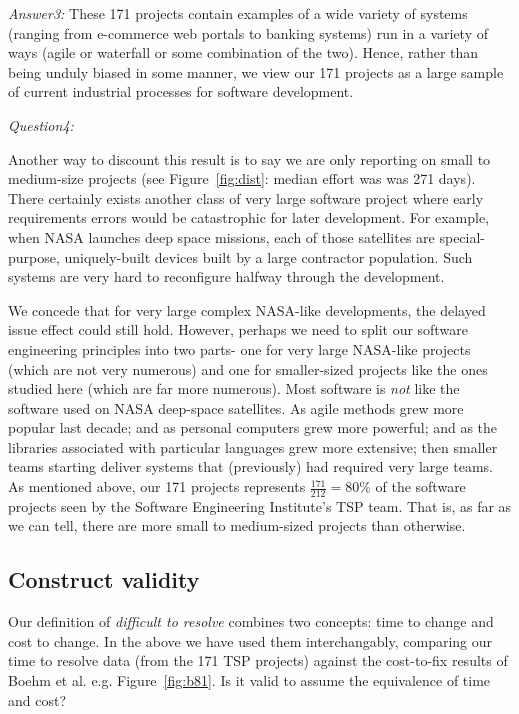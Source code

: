 \documentclass[smallcondesed]{svjour3}
\newcommand{\fig}[1]{Figure~\ref{fig:#1}}
\begin{document}
 {\em Answer3:} These 171 projects contain examples of a wide variety
 of systems (ranging from e-commerce web portals to  banking systems) run in a variety of
 ways (agile or  waterfall or some combination of the two). Hence, rather
 than being unduly  biased in some manner,
 we view our 171 projects as a large sample of current industrial processes for software
 development.
 
 {\em Question4:}
 
Another way to discount this result is to say we are only reporting on small to medium-size
projects
(see
\fig{dist}:  median
effort was was  
271 days). 
There certainly exists another class of very large software project where early requirements
errors would be catastrophic for later development. For example, when NASA launches deep space missions,
each of those satellites are special-purpose, uniquely-built devices built by a large contractor
population. Such systems are very hard to reconfigure halfway through the development.  

We concede that for very large complex NASA-like developments, the delayed issue
effect could still hold. However, perhaps we need to split our software engineering principles
into two parts- one for   very large NASA-like projects (which are not very numerous)
and one for smaller-sized projects like the ones studied here (which are far more numerous).
Most software is {\em not} like the software used on NASA deep-space satellites.
As  agile methods grew more popular last decade; and as personal computers grew more powerful;
and as the libraries associated with particular languages grew more extensive; then smaller
teams starting  deliver systems that (previously) had required very large teams.
As mentioned above,
our  171 projects represents $\frac{171}{212}=80$\% of the software projects
seen by the Software Engineering Institute's TSP team.
That is, as far as we can tell,
there are more small to medium-sized projects than otherwise.





\subsection{Construct validity} 

Our definition of {\em difficult to resolve} combines two concepts: time to change and cost to
change. In the above we have used them interchangably, comparing our time to resolve data (from the 171 TSP projects) against the cost-to-fix results of Boehm et al. e.g. \fig{b81}.
Is it valid to assume the equivalence of time and cost?
\end{document}
